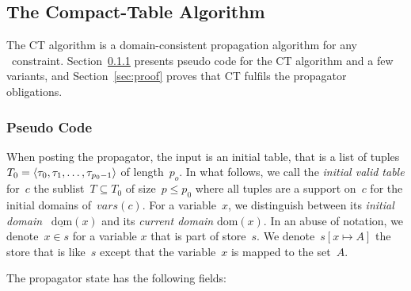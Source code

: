 \documentclass[a4paper,11pt]{article}
\newcommand{\Secref}[1]{Section~\ref{#1}}
\newcommand{\Table}{\Constraint{Table}}
\newcommand{\Dom}[1]{\text{dom}({#1})}
\newcommand{\Dominit}[1]{\underline{\text{dom}}(#1)}
\numberwithin{equation}{section}
\begin{document}
\subsection{The Compact-Table Algorithm}
\label{sec:ct}
The CT algorithm is a domain-consistent propagation
algorithm for any \Table~constraint. \Secref{ct:pseudo}
presents pseudo code for the CT algorithm and a few variants,
and \Secref{sec:proof} proves that CT fulfils the propagator
obligations.

\subsubsection{Pseudo Code}
\label{ct:pseudo}

When posting the propagator, the input is an initial table, that is
a list of tuples $T_0 = \left\langle\tau_0, \tau_1, \ldots, \tau_{p_0-1}\right\rangle$ of
length~$p_o$. In what follows, we call the \emph{initial valid table}
for~$c$ the sublist~$T \subseteq T_0$ of size~$p \leq p_0$ where all
tuples are a support on~$c$ for the initial domains of~$\mathit{vars}(c)$.
For a variable~$x$, we distinguish between its \emph{initial domain}
~$\Dominit{x}$ and its \emph{current domain} $\Dom{x}$.
In an abuse of notation, we denote~$x \in s$ for a variable
$x$ that is part of store~$s$. We denote~$s[x \mapsto A]$
the store that is like~$s$ except that the variable~$x$ is mapped
to the set~$A$.

The propagator state has the following fields:
\end{document}

